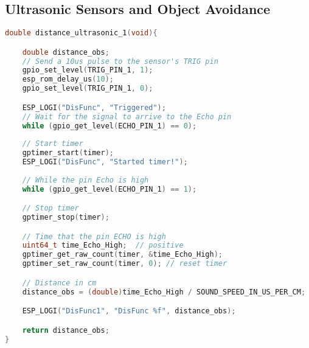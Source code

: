 \documentclass[../report.tex]{subfiles}
\begin{document}
\subsection{Ultrasonic Sensors and Object Avoidance}

\begin{lstlisting}[language=c,caption={The Ultrasonic Code},label={code:ultrasonic}]
    double distance_ultrasonic_1(void){

    double distance_obs;
    // Send a 10us pulse to the sensor's TRIG pin
    gpio_set_level(TRIG_PIN_1, 1);
    esp_rom_delay_us(10);
    gpio_set_level(TRIG_PIN_1, 0);

    ESP_LOGI("DisFunc", "Triggered");
    // Wait for the signal to arrive to the Echo pin
    while (gpio_get_level(ECHO_PIN_1) == 0);
    
    // Start timer 
    gptimer_start(timer);
    ESP_LOGI("DisFunc", "Started timer!");
    
    // While the pin Echo is high
    while (gpio_get_level(ECHO_PIN_1) == 1);

    // Stop timer
    gptimer_stop(timer);

    // Time that the pin ECHO is high 
    uint64_t time_Echo_High;  // positive
    gptimer_get_raw_count(timer, &time_Echo_High);  
    gptimer_set_raw_count(timer, 0); // reset timer

    // Distance in cm
    distance_obs = (double)time_Echo_High / SOUND_SPEED_IN_US_PER_CM;

    ESP_LOGI("DisFunc1", "DisFunc %f", distance_obs);

    return distance_obs;
}
\end{lstlisting}
\end{document}
